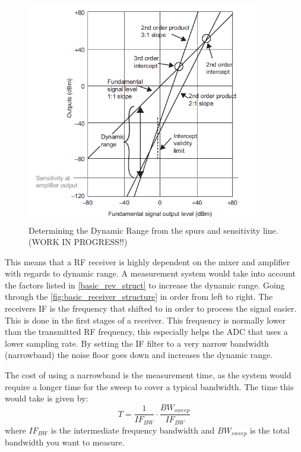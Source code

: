 \begin{figure}[H]
\centering
\includegraphics[width=0.90\textwidth]{figures/Dynamic_range_calc.png}
\caption{Determining the Dynamic Range from the spurs and sensitivity line.(WORK IN PROGRESS!!)}
\label{Dynamic_range_calc}
\end{figure}
 
This means that a RF receiver is highly dependent on the mixer and amplifier with regards to dynamic range. A measurement system would take into account the factors listed in \autoref{basic_rev_struct} to increase the dynamic range. Going through the \autoref{fig:basic_receiver_structure} in order from left to right. The receivers \gls{IF} is the frequency that shifted to in order to process the signal easier.  This is done in the first stages of a receiver. This frequency is normally lower than the transmitted RF frequency, this especially helps the \gls{ADC} that uses a lower sampling rate. 
By setting the \gls{IF} filter to a very narrow bandwidth (narrowband) the noise floor goes down and increases the dynamic range. 

The cost of using a narrowband is the measurement time, as the system would require a longer time for the sweep to cover a typical bandwidth. The time this would take is given by:
\begin{equation}
T = \frac{1}{IF_{BW}} \cdot \frac{BW_{sweep}}{IF_{BW}}
\end{equation}
where $IF_{BW}$ is the intermediate frequency bandwidth and $BW_{sweep}$ is the total bandwidth you want to measure.


